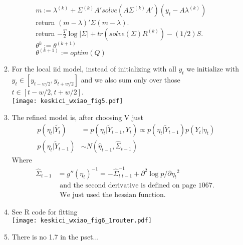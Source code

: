 \documentclass[paper=a4, fontsize=11pt]{scrartcl}
\begin{document}
\begin{enumerate}
\begin{enumerate}[1]
\begin{enumerate}[a.]
\begin{enumerate}[I.]
\begin{tabbing}
                  \hspace{3cm} $m := \lambda^{(k)} + \Sigma^{(k)}A'solve(A\Sigma^{(k)}A')(y_t - A\lambda^{(k)})$ \\
                  \hspace{3cm} return $(m - \lambda)'\Sigma(m - \lambda)$. \\
                  \hspace{2cm} return $-\frac{T}{2}\log{|\Sigma|} + tr(solve(\Sigma)R^{(k)}) - (1/2)S$. \\
                  \hspace{1cm} $\theta^{k} := \theta^{(k+1)}$ \\
                  \hspace{1cm} $\theta^{(k+1)} := optim(Q)$
                \end{tabbing}
            \end{enumerate}
        \end{enumerate}
        \newpage
      \item For the local iid model, instead of initializing with all $y_t$ we initialize with $y_t \in [y_{t - w/2}, y_{t+w/2}]$ and we also sum only over those $t \in [t - w/2, t + w/2]$. \\ \texttt{[image: keskici\_wxiao\_fig5.pdf]}
      \item The refined model is, after choosing V just \\
      \begin{align*}
        p(\eta_t|\widetilde{Y_t}) &= p(\eta_t|\widetilde{Y}_{t-1}, Y_t) \propto p(\eta_t|\widetilde{Y}_{t-1})p(Y_t|\eta_t) \\
        p(\eta_t|\widetilde{Y}_{t-1}) &\sim N(\hat{\eta}_{t-1}, \hat{\Sigma}_{t-1})
      \end{align*}
      Where
      \begin{align*}
        \hat{\Sigma}_{t-1} &= g''(\eta_t)^{-1} = -\hat{\Sigma}^{-1}_{t|t-1} + \partial^2{\log{p}}/\partial{\eta_t}^2 \\
        & \text{ and the second derivative is defined on page 1067. } \\
        & \text { We just used the hessian function. }
      \end{align*}
      \newpage
      \item See R code for fitting\\
      \texttt{[image: keskici\_wxiao\_fig6\_1router.pdf]}
      \newpage
      \item There is no 1.7 in the pset...

\end{enumerate}
\end{enumerate}
\end{document}
